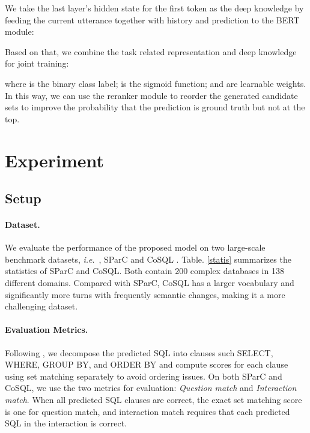 \documentclass[letterpaper]{article} \usepackage{aaai21}  \usepackage{times}  \usepackage{helvet} \usepackage{courier}  \usepackage[hyphens]{url}  \usepackage{graphicx} \urlstyle{rm} \def\UrlFont{\rm}  \usepackage{natbib}  \usepackage{caption} \frenchspacing  \setlength{\pdfpagewidth}{8.5in}  \setlength{\pdfpageheight}{11in}
\def\ie{\emph{i.e}.~}
\begin{document}
We take the last layer’s hidden state for the first token  as the deep knowledge  by feeding the current utterance  together with history and prediction  to the BERT module:

Based on that, we combine the task related representation and deep knowledge for joint training:

where  is the binary class label;  is the sigmoid function;  and  are learnable weights.
In this way, we can use the reranker module to reorder the generated candidate sets to improve the probability that the prediction is ground truth but not at the top.


\section{Experiment}

\subsection{Setup}
\paragraph{Dataset.} 
We evaluate the performance of the proposed model on two large-scale benchmark datasets, \ie, SParC \cite{DBLP:conf/acl/YuZYTLLELPCJDPS19} and CoSQL \cite{DBLP:conf/emnlp/YuZELXPLTSLJYSC19}.
Table. \ref{statis} summarizes the statistics of SParC and CoSQL. 
Both contain 200 complex databases in 138 different domains.
Compared with SParC, CoSQL has a larger vocabulary and significantly more turns with frequently semantic changes, making it a more challenging dataset.

\paragraph{Evaluation Metrics.}
Following \cite{DBLP:conf/acl/YuZYTLLELPCJDPS19}, we decompose the predicted SQL into clauses such SELECT, WHERE, GROUP BY, and ORDER BY and compute scores for each clause using set matching separately to avoid ordering issues.
On both SParC and CoSQL, we use the two metrics for evaluation:
\textit{Question match} and \textit{Interaction match}.
When all predicted SQL clauses are correct, the exact set matching score is one for question match, and interaction match requires that each predicted SQL in the interaction is correct.
\end{document}
